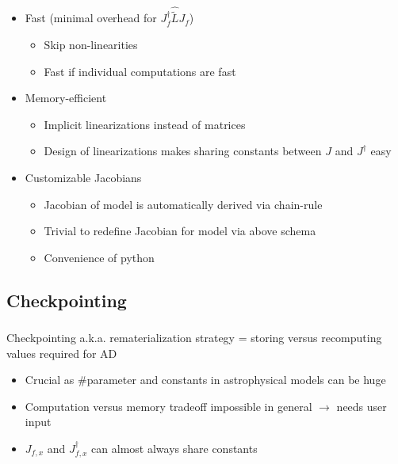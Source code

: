 \documentclass[aspectratio=169,xcolor=dvipsnames]{beamer}
\begin{document}
\begin{frame}
	\frametitle{\insertsection}
	\framesubtitle{\insertsubsection}

	\begin{itemize}
		\item Fast (minimal overhead for $J_{f}^\dagger \widehat{\tilde{L}} J_{f}$)
		\begin{itemize}
			\item Skip non-linearities
			\item Fast if individual computations are fast
		\end{itemize}
		\pause
		\item Memory-efficient
		\begin{itemize}
			\item Implicit linearizations instead of matrices
			\item Design of linearizations makes sharing constants between $J$ and $J^\dagger$ easy
		\end{itemize}
		\pause
		\item Customizable Jacobians
		\begin{itemize}
			\item Jacobian of model is automatically derived via chain-rule
			\item Trivial to redefine Jacobian for model via above schema
			\item Convenience of python
		\end{itemize}
	\end{itemize}

\end{frame}

\subsection{Checkpointing}
\begin{frame}
	\frametitle{\insertsection}
	\framesubtitle{\insertsubsection}

	Checkpointing a.k.a. rematerialization strategy = storing versus recomputing values required for AD

	\begin{itemize}
		\item Crucial as \#parameter and constants in astrophysical models can be huge
		\item Computation versus memory tradeoff impossible in general $\rightarrow$ needs user input
		\item $J_{f,x}$ and $J_{f,x}^\dagger$ can almost always share constants
	\end{itemize}

\end{frame}
\end{document}
